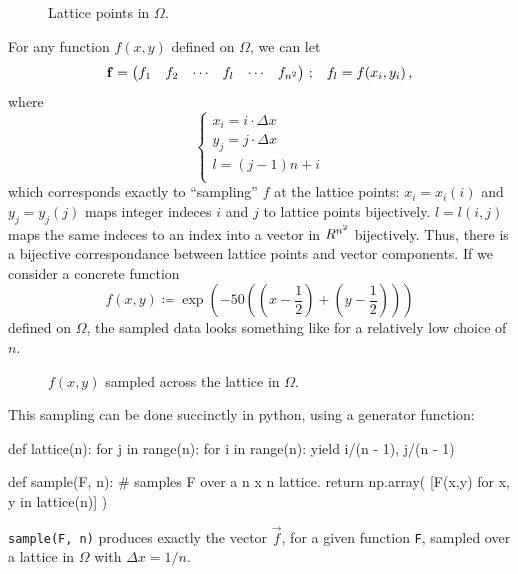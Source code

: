 \documentclass[12pt]{article}
\begin{document}
\begin{multicols}{2}
    \begin{figure}[H]
        \centering
        
        \caption{
            Lattice points in $\Omega$.
        }
        \label{fig:omega}
    \end{figure}\noindent
    For any function $f(x, y)$ defined on $\Omega$, we can let
    \[
        \vec f = \begin{pmatrix}
            f_1 & f_2 & \cdots & f_l & \cdots & f_{n^2}
        \end{pmatrix}
        \,\text; \quad
        f_l = f(x_i, y_i) \,\text,
    \]
    where
    \[
        \left\{\begin{array}{l}
            x_i = i \cdot \Delta x \\
            y_j = j \cdot \Delta x \\
            l = \left(j - 1\right)n + i \\
        \end{array}\right.
    \]
    which corresponds exactly to ``sampling'' $f$ at the lattice points:
    $x_i = x_i(i)$ and $y_j = y_j(j)$ maps integer indeces $i$ and $j$
    to lattice points bijectively.
    $l = l(i,j)$ maps the same indeces to an index into a vector in $\R^{n^2}$
    bijectively.
    Thus, there is a bijective correspondance between lattice points
    and vector components.
    If we consider a concrete function
    \[
        f(x, y) \coloneqq \exp{\left(
            -50 \left(
                \left(x - \frac{1}{2}\right)
                + \left(y - \frac{1}{2}\right)
            \right)
        \right)}
    \]
    defined on $\Omega$, the sampled data looks something like
     for a relatively low choice of $n$.
    \begin{figure}[H]
        \centering
        
        \caption{
            $f(x, y)$ sampled across the lattice in $\Omega$.
        }
        \label{fig:sample}
    \end{figure}\noindent
    This sampling can be done succinctly in python, using
    a generator function:
    \begin{python}[
        caption={Program to sample functions over lattices}
   ]
def lattice(n):
    for j in range(n):
        for i in range(n):
            yield i/(n - 1), j/(n - 1)

def sample(F, n):
    # samples F over a n x n lattice.
    return np.array(
        [F(x,y) for x, y in lattice(n)]
    )
    \end{python}
    {\tt sample(F, n)} produces exactly the vector $\vec f$,
    for a given function {\tt F}, sampled over a lattice
    in $\Omega$ with $\Delta x = 1/n$.


\end{multicols}
\end{document}
